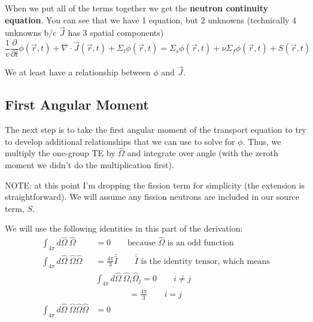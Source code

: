 \documentclass[12pt]{article}
\newlength{\up}
\newcommand{\vOmega}{\ensuremath{\hat{\Omega}}}
\begin{document}
\vspace*{2em}
When we put all of the terms together we get the \textbf{neutron continuity equation}. You can see that we have 1 equation, but 2 unknowns (technically 4 unknowns b/c $\vec{J}$ has 3 spatial components)
\begin{equation}
\frac{1}{v}\frac{\partial}{\partial t}\phi(\vec{r}, t) + 
\nabla \cdot \vec{J}(\vec{r}, t) + 
\Sigma_t \phi(\vec{r}, t) =
\Sigma_s \phi(\vec{r}, t) +
\nu \Sigma_f \phi(\vec{r}, t) +
S(\vec{r}, t)
\end{equation}

We at least have a relationship between $\phi$ and $\vec{J}$.

\subsection{First Angular Moment}

The next step is to take the first angular moment of the transport equation to try to develop additional relationships that we can use to solve for $\phi$. Thus, we multiply the one-group TE by $\vOmega$ and integrate over angle (with the zeroth moment we didn't do the multiplication first). 

NOTE: at this point I'm dropping the fission term for simplicity (the extension is straightforward). We will assume any fission neutrons are included in our source term, $S$. 


We will use the following identities in this part of the derivation:
\begin{align} 
\int_{4\pi} d\vOmega \:\vOmega &= 0 \qquad \text{because }\vOmega\text{ is an odd function} \\
%
\int_{4\pi} d\vOmega\: \vOmega \vOmega &= \frac{4\pi}{3}\bar{\bar{I}} \qquad \bar{\bar{I}}\text{ is the identity tensor, which means} \\
%
&\int_{4\pi} d\vOmega\: \vOmega_i \vOmega_j = 0 \qquad i \neq j \nonumber \\
&\qquad \qquad = \frac{4\pi}{3} \qquad i = j \nonumber \\
%
\int_{4\pi} d\vOmega \: \vOmega \vOmega \vOmega &= 0 \qquad \\
\end{align}
\end{document}
